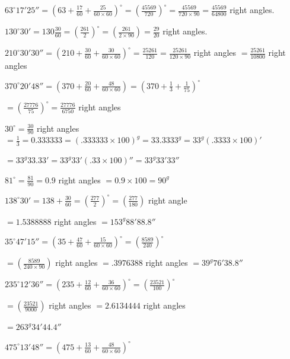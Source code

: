 \item $63^\circ17'25'' = \left(63 + \frac{17}{60} + \frac{25}{60\times 60}\right)^\circ = \left(\frac{45569}{720}\right)^\circ =
   \frac{45569}{720\times90} = \frac{45569}{64800}$ right angles.

\item $130^\circ30' = 130\frac{30}{60} = \left(\frac{261}{2}\right)^\circ = \left(\frac{261}{2\times 90}\right) = \frac{29}{20}$
   right angles.

\item $210^\circ30'30'' = \left(210 + \frac{30}{60} + \frac{30}{60\times 60}\right)^\circ = \frac{25261}{120} =
   \frac{25261}{120\times 90}$ right angles $= \frac{25261}{10800}$ right angles

\item $370^\circ 20'48'' = \left(370 + \frac{20}{60} + \frac{48}{60\times 60}\right) = \left(370 + \frac{1}{3} +
    \frac{1}{75}\right)^\circ$

    $= \left(\frac{27776}{75}\right)^\circ = \frac{27776}{6750}$ right angles

\item $30^\circ = \frac{30}{90}$ right angles $= \frac{1}{3} = 0.333333 = (.333333 \times 100)^g = 33.3333^g =
    33^g(.3333\times 100)'$

    $= 33^g33.33' = 33^g33'(.33\times 100)'' = 33^g33'33''$

\item $81^\circ = \frac{81}{90} = 0.9$ right angles $= 0.9 \times 100 = 90^g$

\item $138^\circ 30' = 138 + \frac{30}{60} = \left(\frac{277}{2}\right)^\circ = \left(\frac{277}{180}\right)$ right angle

    $= 1.5388888$ right angles $= 153^g88'88.8''$

\item $35^\circ47'15'' = \left(35 + \frac{47}{60} + \frac{15}{60\times 60}\right)^\circ = \left(\frac{8589}{240}\right)^\circ$

    $= \left(\frac{8589}{240\times 90}\right)$ right angles $= .3976388$ right angles $=39^g76'38.8''$
\item $235^\circ12'36'' = \left(235 + \frac{12}{60} + \frac{36}{60\times 60}\right)^\circ =
    \left(\frac{23521}{100}\right)^\circ$

    $= \left(\frac{23521}{9000}\right)$ right angles $= 2.6134444$ right angles

    $= 263^g34'44.4''$
\item $475^\circ13'48'' = \left(475 + \frac{13}{60} + \frac{48}{60\times 60}\right)^\circ$

